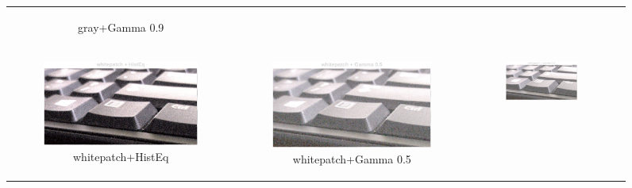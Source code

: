 \documentclass[11pt, a4]{article}
\begin{document}
\begin{enumerate}
\begin{enumerate}
\begin{figure}[h]
{\begin{tabular}{cccc}
\begin{subfigure}[h]{0.45\linewidth}
							\caption{gray+Gamma 0.9}
							\label{fig:RawImage2_tone_4}
						\end{subfigure}\\
						\begin{subfigure}[h]{0.45\linewidth}
							\centering
							\includegraphics[width=\linewidth]{../output/RawImage2_Tone_whitepatch_HistEq.pdf}
							\caption{whitepatch+HistEq}
							\label{fig:RawImage2_tone_5}
						\end{subfigure} &
						\begin{subfigure}[h]{0.45\linewidth}
							\centering
							\includegraphics[width=\linewidth]{../output/RawImage2_Tone_whitepatch_Gamma0.5.pdf}
							\caption{whitepatch+Gamma 0.5}
							\label{fig:RawImage2_tone_6}
						\end{subfigure} &
						\begin{subfigure}[h]{0.45\linewidth}
							\centering
							\includegraphics[width=\linewidth]{../output/RawImage2_Tone_whitepatch_Gamma0.5.pdf}

\end{subfigure}
\end{tabular}}
\end{figure}
\end{enumerate}
\end{enumerate}
\end{document}
